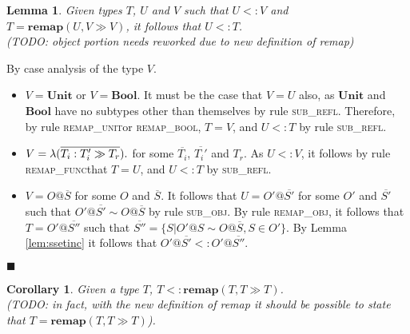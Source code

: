 \documentclass[preprint]{sigplanconf}
\newtheorem{lem}{Lemma}
\newtheorem{cor}{Corollary}
\newcommand{\lemref}[1]{Lemma \ref{#1}}
\newcommand{\subrefl}{\textsc{sub\_refl}}
\newcommand{\subobj}{\textsc{sub\_obj}}
\newcommand{\remapunit}{\textsc{remap\_unit}}
\newcommand{\remapbool}{\textsc{remap\_bool}}
\newcommand{\remapfunc}{\textsc{remap\_func}}
\newcommand{\remapobj}{\textsc{remap\_obj}}
\newcommand{\remapapp}[3]{\ensuremath{\mathbf{remap}(#1, #2 \gg #3)}}
\newcommand{\unitt}{\mathbf{Unit}}
\newcommand{\boolt}{\mathbf{Bool}}
\newcommand{\funv}[4]{\lambda(\overline{#1 : #2 \gg #3}).#4}
\newcommand{\qed}{$\blacksquare$}
\newenvironment{proof}{\vspace{1ex}\noindent{\bf Proof}\hspace{0.5em}}
  {\hfill\qed\vspace{1ex}}
\begin{document}
\begin{lem}
\label{lem:remapeff}
Given types $T$, $U$ and $V$ such that $U <: V$ and $T = \remapapp{U}{V}{V}$, 
it follows that $U <: T$. \\
(TODO: object portion needs reworked due to new definition of remap)
\end{lem}
\begin{proof}
By case analysis of the type $V$.

\begin{itemize}
\item $V = \unitt$ or $V = \boolt$. 
It must be the case that $V = U$ also, as $\unitt$ and $\boolt$
have no subtypes other than themselves by rule \subrefl.
Therefore, by rule \remapunit or \remapbool, $T = V$,
and $U <: T$ by rule \subrefl.

\item $V = \funv{T_i}{T_i'}{T_r}$ for some $\overline{T_i}$, $\overline{T_i'}$
and $T_r$. As $U <: V$, it follows by rule \remapfunc that
$T = U$, and $U <: T$ by \subrefl.

\item $V = O@\overline{S}$ for some $O$ and $\overline{S}$. 
It follows that $U = O'@\overline{S'}$ 
for some $O'$ and $\overline{S'}$ 
such that $O'@\overline{S'} \sim O@\overline{S}$ 
by rule \subobj. 
By rule \remapobj, it follows that $T = O'@\overline{S''}$ 
such that $\overline{S''} = \{ S | O'@S \sim O@\overline{S}, S \in O' \}$.
By \lemref{lem:ssetinc} it follows that 
$O'@\overline{S'} <: O'@\overline{S''}$.

\end{itemize}
\end{proof}


\begin{cor}
\label{lem:remapsame}
Given a type $T$, $T <: \remapapp{T}{T}{T}$. \\
(TODO: in fact, with the new definition of remap it should be possible to
state that $T = \remapapp{T}{T}{T}$).
\end{cor}

\end{document}
